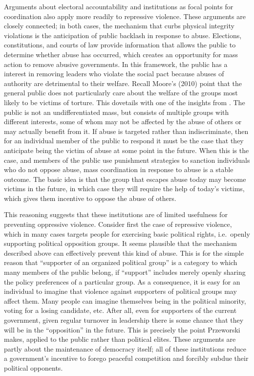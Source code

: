 \documentclass[12pt]{article}
\begin{document}
Arguments about electoral accountability and institutions as focal points for coordination also apply more readily to repressive violence. These arguments are closely connected; in both cases, the mechanism that curbs physical integrity violations is the anticipation of public backlash in response to abuse. Elections, constitutions, and courts of law provide information that allows the public to determine whether abuse has occurred, which creates an opportunity for mass action to remove abusive governments. In this framework, the public has a interest in removing leaders who violate the social pact because abuses of authority are detrimental to their welfare. Recall Moore's (2010) point that the general public does not particularly care about the welfare of the groups most likely to be victims of torture. This dovetails with one of the insights from \citet{Weingast1997}. The public is not an undifferentiated mass, but consists of multiple groups with different interests, some of whom may not be affected by the abuse of others or may actually benefit from it. If abuse is targeted rather than indiscriminate, then for an individual member of the public to respond it must be the case that they anticipate being the victim of abuse at some point in the future. When this is the case, and members of the public use punishment strategies to sanction individuals who do not oppose abuse, mass coordination in response to abuse is a stable outcome. The basic idea is that the group that escapes abuse today may become victims in the future, in which case they will require the help of today's victims, which gives them incentive to oppose the abuse of others. 

This reasoning suggests that these institutions are of limited usefulness for preventing oppressive violence. Consider first the case of repressive violence, which in many cases targets people for exercising basic political rights, i.e.\ openly supporting political opposition groups. It seems plausible that the mechanism described above can effectively prevent this kind of abuse. This is for the simple reason that ``supporter of an organized political group'' is a category to which many members of the public belong, if ``support'' includes merely openly sharing the policy preferences of a particular group. As a consequence, it is easy for an individual to imagine that violence against supporters of political groups may affect them. Many people can imagine themselves being in the political minority, voting for a losing candidate, etc. After all, even for supporters of the current government, given regular turnover in leadership there is some chance that they will be in the ``opposition'' in the future. This is precisely the point Przeworski makes, applied to the public rather than political elites. These arguments are partly about the maintenance of democracy itself; all of these institutions reduce a government's incentive to forego peaceful competition and forcibly subdue their political opponents.  
\end{document}
